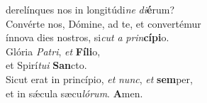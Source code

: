 \evenverse derelínques nos in longitúdi\textit{ne} \textit{di}\textbf{é}rum?\\
\oddverse Convérte nos, Dómine, ad te, et convertémur~\*\\
\oddverse ínnova dies nostros, si\textit{cut} \textit{a} \textit{prin}\textbf{cí}\textbf{pi}o.\\
\evenverse Glória \textit{Pa}\textit{tri}, \textit{et} \textbf{Fí}\textbf{li}o,~\*\\
\evenverse et Spirí\textit{tu}\textit{i} \textbf{San}cto.\\
\oddverse Sicut erat in princípio, \textit{et} \textit{nunc}, \textit{et} \textbf{sem}per,~\*\\
\oddverse et in sǽcula sæcu\textit{ló}\textit{rum}. \textbf{A}men.\\
